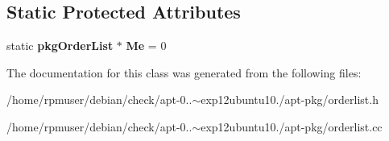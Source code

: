 \subsection*{\-Static \-Protected \-Attributes}
\begin{DoxyCompactItemize}
\item 
static {\bf pkg\-Order\-List} $\ast$ {\bfseries \-Me} = 0\label{classpkgOrderList_a28cf5cef8d1b66dc714ea5e36435287e}

\end{DoxyCompactItemize}


\-The documentation for this class was generated from the following files\-:\begin{DoxyCompactItemize}
\item 
/home/rpmuser/debian/check/apt-\/0..$\sim$exp12ubuntu10./apt-\/pkg/orderlist.\-h\item 
/home/rpmuser/debian/check/apt-\/0..$\sim$exp12ubuntu10./apt-\/pkg/orderlist.\-cc\end{DoxyCompactItemize}
